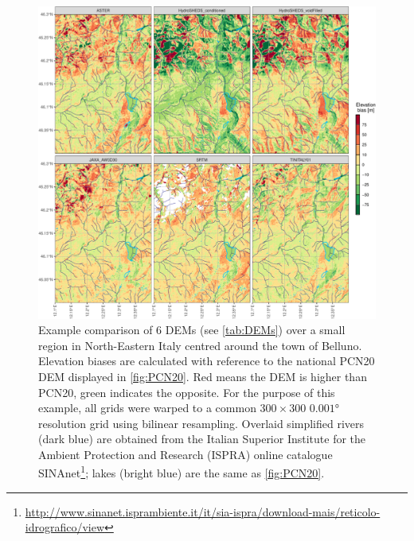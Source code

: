 \begin{figure}
    \centering
    \includegraphics[width=\textwidth]{figures/DEM/bias_with_PCN20.pdf}
    \decoRule
    \caption[Comparison of DEMs: bias with PCN20]{
    Example comparison of 6 DEMs (see \cref{tab:DEMs}) over a small region in North-Eastern Italy centred around the town of Belluno. Elevation biases are calculated with reference to the national PCN20 DEM displayed in \cref{fig:PCN20}. Red means the DEM is higher than PCN20, green indicates the opposite. For the purpose of this example, all grids were warped to a common $300 \times 300$ $\ang{0.001}$ resolution grid using bilinear resampling. Overlaid simplified rivers (dark blue) are obtained from the Italian Superior Institute for the Ambient Protection and Research (ISPRA) online catalogue SINAnet\footnote{\url{http://www.sinanet.isprambiente.it/it/sia-ispra/download-mais/reticolo-idrografico/view}}; lakes (bright blue) are the same as \cref{fig:PCN20}.
} \label{fig:DEMs_bias}
\end{figure}

